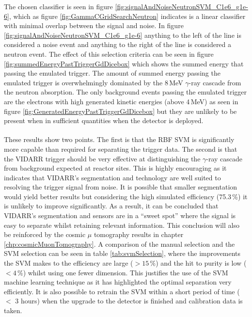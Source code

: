 The chosen classifier is seen in figure \ref{fig:signalAndNoiseNeutronSVM_C1e6_g1e-6}, which as figure \ref{fig:GammaCGridSearchNeutron} indicates is a linear classifier with minimal overlap between the signal and noise. In figure \ref{fig:signalAndNoiseNeutronSVM_C1e6_g1e-6} anything to the left of the line is considered a noise event and anything to the right of the line is considered a neutron event. The effect of this selection criteria can be seen in figure \ref{fig:summedEnergyPastTriggerGdDicebox} which shows the summed energy that passing the emulated trigger. The amount of summed energy passing the emulated trigger is overwhelmingly dominated by the 8\,MeV $\gamma$-ray cascade from the neutron absorption. The only background events passing the emulated trigger are the electrons with high generated kinetic energies (above 4\,MeV) as seen in figure \ref{fig:GeneratedEnergyPastTriggerGdDicebox} but they are unlikely to be present when in sufficient quantities when the detector is deployed. 
\\\\These results show two points. The first is that the RBF SVM is significantly more capable than required for separating the trigger data. The second is that the VIDARR trigger should be very effective at distinguishing the $\gamma$-ray cascade from background expected at reactor sites. This is highly encouraging as it indicates that VIDARR's segmentation and technology are well suited to resolving the trigger signal from noise. It is possible that smaller segmentation would yield better results but considering the high simulated efficiency (75.3\,\%) it is unlikely to improve significantly. As a result, it can be concluded that VIDARR's segmentation and sensors are in a ``sweet spot'' where the signal is easy to separate whilst retaining relevant information. This conclusion will also be reinforced by the cosmic $\mu$ tomography results in chapter \ref{chp:cosmicMuonTomography}. A comparison of the manual selection and the SVM selection can be seen in table \ref{tab:svmSelection}, where the improvements the SVM makes to the efficiency are large ($> 15\,\%$) and the hit to purity is low ($< 4\,\%$) whilst using one fewer dimension. This justifies the use of the SVM machine learning technique as it has highlighted the optimal separation very efficiently. It is also possible to retrain the SVM within a short period of time ($<$ 3 hours) when the upgrade to the detector is finished and calibration data is taken.  

